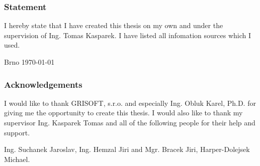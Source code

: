 \begin{titlepage}
	\subsubsection{Statement}
	I hereby state that I have created this thesis on my own and under
	the supervision of Ing. Tomas Kasparek. I have listed all infomation
	sources which I used.

	\vspace{3cm}
	\noindent \parbox[t]{12cm}{\noindent Brno {\today} \hfill \dotfill \\}
	\vspace{4cm}

	\subsubsection{Acknowledgements}
	I would like to thank GRISOFT, s.r.o. and especially Ing. Obluk Karel, Ph.D.
	for giving me the opportunity to create this thesis. I would also like to
	thank my supervisor Ing. Kasparek Tomas and all of the following people for
	their help and support.

	\noindent Ing. Suchanek Jaroslav, Ing. Hemzal Jiri and Mgr. Bracek Jiri,
	Harper-Dolejsek Michael.
\end{titlepage}
